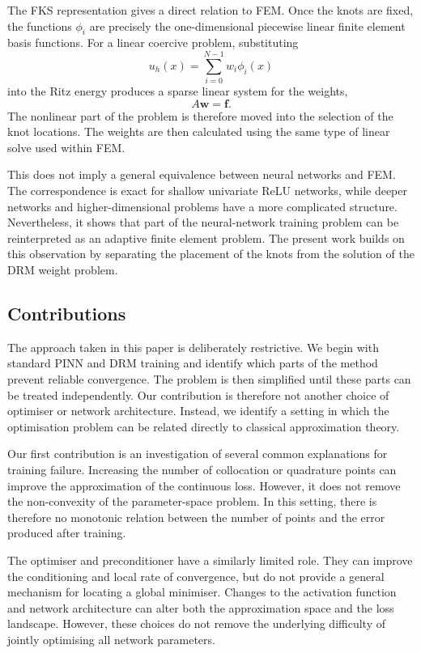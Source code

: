 \documentclass[11pt, onecolumn]{report}
\begin{document}
The FKS representation gives a direct relation to FEM. Once the knots are fixed, the functions $\phi_i$ are precisely the one-dimensional piecewise linear finite element basis functions. For a linear coercive problem, substituting
\begin{equation*}
    u_h(x)=\sum_{i=0}^{N-1}w_i\phi_i(x)
\end{equation*}
into the Ritz energy produces a sparse linear system for the weights,
\begin{equation*}
    A\mathbf{w}=\mathbf{f}.
\end{equation*}
The nonlinear part of the problem is therefore moved into the selection of the knot locations. The weights are then calculated using the same type of linear solve used within FEM.

This does not imply a general equivalence between neural networks and FEM. The correspondence is exact for shallow univariate ReLU networks, while deeper networks and higher-dimensional problems have a more complicated structure. Nevertheless, it shows that part of the neural-network training problem can be reinterpreted as an adaptive finite element problem. The present work builds on this observation by separating the placement of the knots from the solution of the DRM weight problem.

\subsection{Contributions}

The approach taken in this paper is deliberately restrictive. We begin with standard PINN and DRM training and identify which parts of the method prevent reliable convergence. The problem is then simplified until these parts can be treated independently. Our contribution is therefore not another choice of optimiser or network architecture. Instead, we identify a setting in which the optimisation problem can be related directly to classical approximation theory.

Our first contribution is an investigation of several common explanations for training failure. Increasing the number of collocation or quadrature points can improve the approximation of the continuous loss. However, it does not remove the non-convexity of the parameter-space problem. In this setting, there is therefore no monotonic relation between the number of points and the error produced after training. 

The optimiser and preconditioner have a similarly limited role. They can improve the conditioning and local rate of convergence, but do not provide a general mechanism for locating a global minimiser. Changes to the activation function and network architecture can alter both the approximation space and the loss landscape. However, these choices do not remove the underlying difficulty of jointly optimising all network parameters. 
\end{document}
